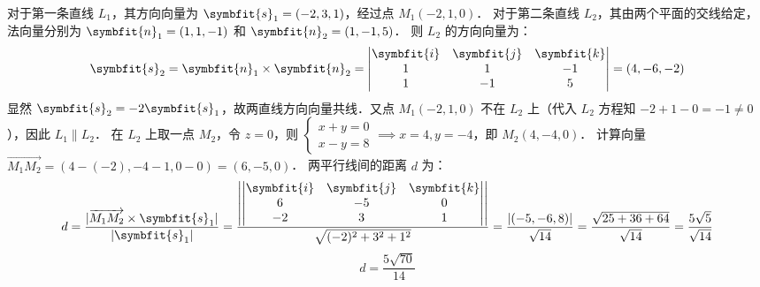 \begin{solution}

    对于第一条直线 $L_1$，其方向向量为 $\symbfit{s}_1 = (-2, 3, 1)$，经过点 $M_1(-2, 1, 0)$．
    对于第二条直线 $L_2$，其由两个平面的交线给定，法向量分别为 $\symbfit{n}_1 = (1, 1, -1)$ 和 $\symbfit{n}_2 = (1, -1, 5)$．
    则 $L_2$ 的方向向量为：
    \begin{equation}
        \symbfit{s}_2 = \symbfit{n}_1 \times \symbfit{n}_2 = \begin{vmatrix} \symbfit{i} & \symbfit{j} & \symbfit{k} \\ 1 & 1 & -1 \\ 1 & -1 & 5 \end{vmatrix} = (4, -6, -2)
    \end{equation}
    显然 $\symbfit{s}_2 = -2 \symbfit{s}_1$，故两直线方向向量共线．又点 $M_1(-2, 1, 0)$ 不在 $L_2$ 上（代入 $L_2$ 方程知 $-2+1-0 = -1 \neq 0$），因此 $L_1 \parallel L_2$．
    在 $L_2$ 上取一点 $M_2$，令 $z=0$，则 $\begin{cases} x+y=0 \\ x-y=8 \end{cases} \implies x=4, y=-4$，即 $M_2(4, -4, 0)$．
    计算向量 $\overrightarrow{M_1 M_2} = (4 - (-2), -4 - 1, 0 - 0) = (6, -5, 0)$．
    两平行线间的距离 $d$ 为：
    \begin{equation}
        d = \frac{|\overrightarrow{M_1 M_2} \times \symbfit{s}_1|}{|\symbfit{s}_1|} = \frac{\left| \begin{vmatrix} \symbfit{i} & \symbfit{j} & \symbfit{k} \\ 6 & -5 & 0 \\ -2 & 3 & 1 \end{vmatrix} \right|}{\sqrt{(-2)^2 + 3^2 + 1^2}} = \frac{|(-5, -6, 8)|}{\sqrt{14}} = \frac{\sqrt{25 + 36 + 64}}{\sqrt{14}} = \frac{5\sqrt{5}}{\sqrt{14}}
    \end{equation}
    \begin{equation}
        \boxed{d = \frac{5\sqrt{70}}{14}}
    \end{equation}



\end{solution}
